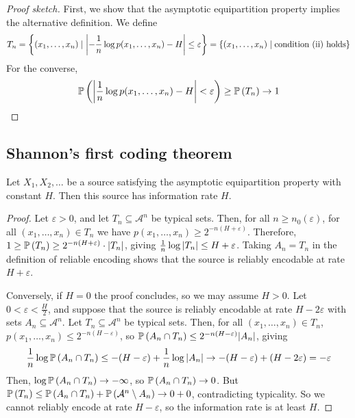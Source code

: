 \begin{proof}[Proof sketch]
    First, we show that the asymptotic equipartition property implies the alternative definition.
    We define
    \[ T_n = \qty{(x_1, \dots, x_n) \mid \abs{-\frac{1}{n} \log p(x_1, \dots, x_n) - H} \leq \varepsilon} = \qty{(x_1, \dots, x_n) \mid \text{condition (ii) holds}} \]
    For the converse,
    \[ \mathbb{P}\left({\abs{\frac{1}{n}\log p(x_1, \dots, x_n) - H} < \varepsilon}\right) \geq \mathbb{P}\left({T_n}\right) \to 1 \]
\end{proof}

\subsection{Shannon's first coding theorem}
\begin{theorem}
    Let \( X_1, X_2, \dots \) be a source satisfying the asymptotic equipartition property with constant \( H \).
    Then this source has information rate \( H \).
\end{theorem}
\begin{proof}
    Let \( \varepsilon > 0 \), and let \( T_n \subseteq \mathcal A^n \) be typical sets.
    Then, for all \( n \geq n_0(\varepsilon) \), for all \( (x_1, \dots, x_n) \in T_n \) we have \( p(x_1, \dots, x_n) \geq 2^{-n(H + \varepsilon)} \).
    Therefore, \( 1 \geq \mathbb{P}\left({T_n}\right) \geq 2^{-n(H + \varepsilon)} \cdot \abs{T_n} \), giving \( \frac{1}{n} \log \abs{T_n} \leq H + \varepsilon \).
    Taking \( A_n = T_n \) in the definition of reliable encoding shows that the source is reliably encodable at rate \( H + \varepsilon \).

    Conversely, if \( H = 0 \) the proof concludes, so we may assume \( H > 0 \).
    Let \( 0 < \varepsilon < \frac{H}{2} \), and suppose that the source is reliably encodable at rate \( H - 2\varepsilon \) with sets \( A_n \subseteq \mathcal A^n \).
    Let \( T_n \subseteq \mathcal A^n \) be typical sets.
    Then, for all \( (x_1, \dots, x_n) \in T_n \), \( p(x_1, \dots, x_n) \leq 2^{-n(H - \varepsilon)} \), so \( \mathbb{P}\left({A_n \cap T_n}\right) \leq 2^{-n(H - \varepsilon)} \abs{A_n} \), giving
    \[ \frac{1}{n} \log \mathbb{P}\left({A_n \cap T_n}\right) \leq -(H - \varepsilon) + \frac{1}{n} \log \abs{A_n} \to -(H - \varepsilon) + (H - 2 \varepsilon) = -\varepsilon \]
    Then, \( \log \mathbb{P}\left({A_n \cap T_n}\right) \to -\infty \), so \( \mathbb{P}\left({A_n \cap T_n}\right) \to 0 \).
    But \( \mathbb{P}\left({T_n}\right) \leq \mathbb{P}\left({A_n \cap T_n}\right) + \mathbb{P}\left({\mathcal A^n \setminus A_n}\right) \to 0 + 0 \), contradicting typicality.
    So we cannot reliably encode at rate \( H - \varepsilon \), so the information rate is at least \( H \).
\end{proof}
